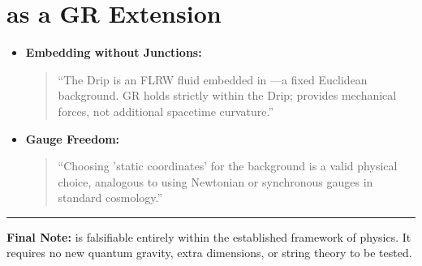\documentclass{BSpacePaper} %
\begin{document}
\section{\bspace{} as a GR Extension}
\begin{itemize}
    \item \textbf{Embedding without Junctions:}
    \begin{quote}
        ``The Drip is an FLRW fluid embedded in \bspace{}—a fixed Euclidean background. GR holds strictly within the Drip; \bspace{} provides mechanical forces, not additional spacetime curvature.''
    \end{quote}
    \item \textbf{Gauge Freedom:}
    \begin{quote}
        ``Choosing 'static coordinates' for the background is a valid physical choice, analogous to using Newtonian or synchronous gauges in standard cosmology.''
    \end{quote}
\end{itemize}

\hrule
\vspace{1em}
\noindent \textbf{Final Note:} \bspace{} is falsifiable entirely within the established framework of physics. It requires no new quantum gravity, extra dimensions, or string theory to be tested.
\end{document}
